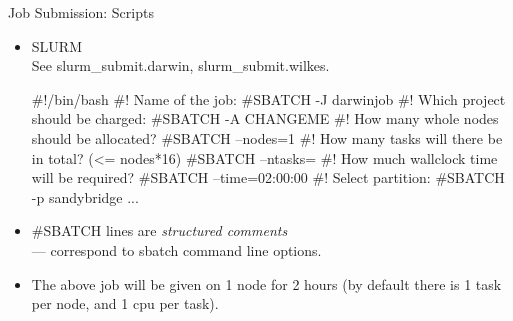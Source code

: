 \begin{frame}[fragile]{Job Submission: Scripts}
\begin{itemize}
\item{SLURM\hfill\\
See \alert{slurm\_submit.darwin}, \alert{slurm\_submit.wilkes}.}
\begin{semiverbatim}
\tiny
#!/bin/bash
#! Name of the job:
{#SBATCH} -J darwinjob
#! Which project should be charged:
{#SBATCH} -A CHANGEME
#! How many whole nodes should be allocated?
{#SBATCH} --nodes=1
#! How many tasks will there be in total? (<= nodes*16)
{#SBATCH} --ntasks={}
#! How much wallclock time will be required?
{\color<2->{red}#SBATCH} --time=02:00:00
#! Select partition:
{#SBATCH} -p sandybridge
...
\end{semiverbatim}
\item<2->{{\color{red}\#SBATCH} lines are \emph{structured comments}\hfill\\
\qquad --- correspond to sbatch command line options.}
\item<3->{\alert{The above job will be given {} on 1 node for 2 hours (by default there is 1 task per node, and 1 cpu per task).}}
\end{itemize}
\end{frame}


